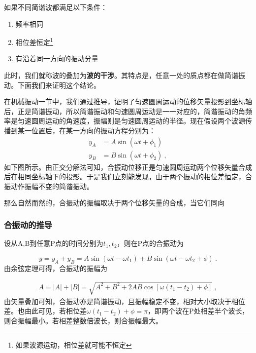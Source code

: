 如果不同简谐波都满足以下条件：
\begin{enumerate}
\item 频率相同
\item 相位差恒定\footnote{如果波源运动，相位差就可能不恒定}
\item 有沿着同一方向的振动分量
\end{enumerate}
此时，我们就称波的叠加为\textbf{波的干涉}。其特点是，任意一处的质点都在做简谐振动。下面我们来证明这个结论。



在机械振动一节中，我们通过推导，证明了匀速圆周运动的位移矢量投影到坐标轴后，正是简谐振动，所以简谐振动和匀速圆周运动是一一对应的，简谐振动的角频率是匀速圆周运动的角速度，振幅则是匀速圆周运动的半径。现在假设两个波源传播到某一位置后，在某一方向的振动方程分别为：
\begin{equation}
\begin{aligned}
y_A&=A\sin(\omega t+\phi_1)\\
y_B&=B\sin (\omega t+\phi_2)~,
\end{aligned}
\end{equation}
如下图所示。由正交分解法可知，合振动位移正是匀速圆周运动两个位移矢量合成后在相同坐标轴下的投影。于是我们立刻能发现，由于两个振动的相位差恒定，合振动作振幅不变的简谐振动。

那么自然而然的，合振动的振幅取决于两个位移矢量的合成，当它们同向
\subsubsection{合振动的推导}


设从A,B到任意P点的时间分别为$t_1,t_2$，则在P点的合振动为

\begin{equation}
y=y_A+y_B=A\sin(\omega t-\omega t_1)+B\sin(\omega t-\omega t_2+\phi)~.
\end{equation}
由余弦定理可得，合振动的振幅为

\begin{equation}
\begin{aligned}
A=|A|+|B|=\sqrt{A^2+B^2+2AB\cos[\omega(t_1-t_2)+\phi]}~,
\end{aligned}
\end{equation}
由矢量叠加可知，合振动亦是简谐振动，且振幅稳定不变，相对大小取决于相位差。也由此可见，若相位差$\omega(t_1-t_2)+\phi=\pi$，即两个波在P处相差半个波长，则合振幅最小。若相差整数倍波长，则合振幅最大。
